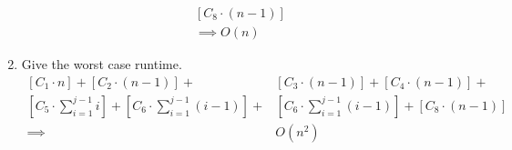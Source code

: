 \documentclass{article}
\begin{document}
\begin{enumerate}
\begin{equation*}
\begin{split}
                  [C_8 \cdot (n - 1)] \\
                  \implies O(n)
              \end{split}
          \end{equation*}
    \item Give the worst case runtime.
          \begin{equation*}
              \begin{split}
                  [C_1 \cdot n] +
                  [C_2 \cdot (n - 1)] + &
                  [C_3 \cdot (n - 1)] +
                  [C_4 \cdot (n - 1)] + \\
                  [C_5 \cdot \sum_{i=1}^{j-1}{i}] +
                  [C_6 \cdot \sum_{i=1}^{j-1}{(i-1)}] + &
                  [C_6 \cdot \sum_{i=1}^{j-1}{(i-1)}] +
                  [C_8 \cdot (n - 1)] \\
                  \implies & O(n^2)
              \end{split}
          \end{equation*}
\end{enumerate}
\end{document}

